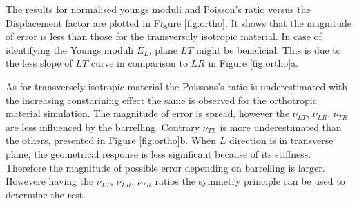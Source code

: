 \documentclass[review]{elsarticle}
\begin{document}
The results for normalised youngs moduli and Poisson's ratio versus the
Displacement factor are plotted in Figure \ref{fig:ortho}. It shows that the
magnitude of error is less than those for the transversaly isotropic material. 
In case of identifying the Youngs moduli $E_L$, plane  $LT$ might be
beneficial. This is due to the less slope of $LT$ curve in comparison to $LR$ in
Figure \ref{fig:ortho}a. \par
As for transversely isotropic material the Poissons's ratio is underestimated
with the increasing constarining effect the same is observed for the orthotropic
material simulation. The magnitude of error is spread, however the $\nu_{LT}$,
$\nu_{LR}$, $\nu_{TR}$ are less influenced by the barrelling. Contrary
$\nu_{TL}$ is more underestimated than the others, presented in Figure
\ref{fig:ortho}b. When $L$
direction is in transverse plane, the geometrical response is less significant
because of its stiffness. Therefore the magnitude of possible error depending on
barrelling is larger. Howevere having the $\nu_{LT}$,
$\nu_{LR}$, $\nu_{TR}$ ratios the symmetry principle can
be used to determine the rest.
\end{document}
